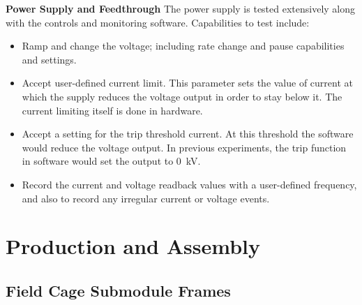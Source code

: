 {\bf Power Supply and Feedthrough} The power supply is tested extensively along with the controls and monitoring software.  
Capabilities to test include:
\begin{itemize}
\item Ramp and change the voltage; including rate change and pause capabilities and settings. 
\item Accept user-defined current limit.  This parameter sets the value of current at which the supply reduces the voltage output in order to stay below it.  The current limiting itself is done in hardware.
\item Accept a setting for the trip threshold current.  At this threshold the software would reduce the voltage output. 
In previous experiments, the trip function in software would set the output to \SI{0}{kV}. 
\item Record the current and voltage readback values with a user-defined frequency, and also to record any irregular current or voltage events. 
\end{itemize}


\section{Production and Assembly}
\label{sec:fddp-hv-prod-assy}

\subsection{Field Cage Submodule Frames}
\label{sec:fddp-hv-prod-assy-fc-frames}



